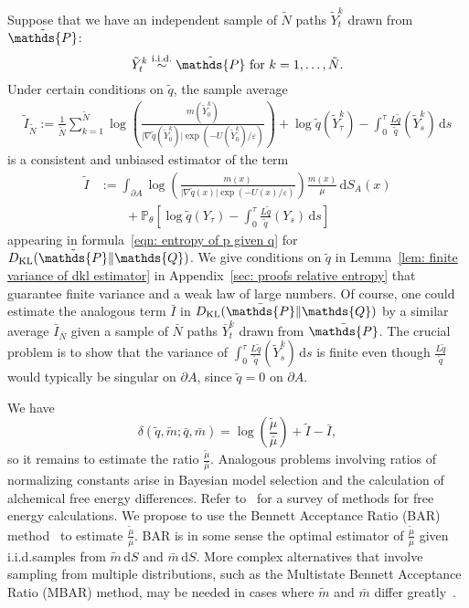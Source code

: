 \documentclass[reqno]{amsart}
\newcommand{\eps}{\varepsilon}
\newcommand{\1}{\mathds{1}}
\renewcommand{\d}{\mathrm{d}}
\newcommand{\grad}{\nabla}
\renewcommand{\P}{\mathds{P}}
\newcommand{\Q}{\mathds{Q}}
\newcommand{\dkl}{D_{\mathrm{KL}}}
\theoremstyle{definition}
\theoremstyle{remark}
\begin{document}
Suppose that we have an independent sample of $\tilde N$ paths $\tilde Y^k_t$ drawn from $\tilde \P$:
\begin{equation*}
  \tilde Y^k_t \overset{\mathrm{i.i.d.}}{\sim}  \tilde \P \text{ for } k = 1, \dots, \tilde N . 
\end{equation*}
Under certain conditions on $\tilde q$, the sample average
\begin{align*}
  \tilde I_{\tilde N}:= \frac{1}{\tilde N} \sum_{k=1}^{\tilde N}   \log \left ( \frac{ m(\tilde Y^k_0)}{\lvert \grad  \tilde q (\tilde Y^k_0) \rvert \exp(-U(\tilde Y^k_0)/\eps)} \right ) + \log \tilde q(\tilde Y^k_\tau) -  \int_0^\tau \frac{L \tilde q}{\tilde q}(\tilde Y^k_s) \, \d s
\end{align*}
is a consistent and unbiased estimator of the term
\begin{align*}
  \tilde I &:= \int_{\partial A}  \log \left ( \frac{ m(x)}{\lvert \grad  \tilde q (x) \rvert \exp(-U(x)/\eps)} \right ) \frac{m(x)}{\mu} \, \d S_A(x) \nonumber \\
                       &\qquad + \P_\theta \left [ \log \tilde q (Y_\tau) -  \int_0^\tau \frac{L \tilde q}{\tilde q}(Y_s) \, \d s  \right ]
\end{align*}
appearing in formula~\eqref{eqn: entropy of p given q} for $\dkl ( \tilde \P \Vert \Q)$. 
 We give conditions on $\tilde q$ in Lemma~\ref{lem: finite variance of dkl estimator} in Appendix~\ref{sec: proofs relative entropy} that guarantee finite variance and a weak law of large numbers. Of course, one could estimate the analogous term $\bar I$ in $\dkl (\bar \P \Vert \Q)$ by a similar average $\bar I_{\bar N}$ given a sample of $\bar N$ paths $\bar Y^k_t$ drawn from $\bar \P$. The crucial problem is to show that the variance of $\int_0^\tau \frac{L \tilde q}{\tilde q}(\tilde Y^k_s) \, \d s$ is finite even though $\frac{L \tilde q}{\tilde q}$ would typically be singular on $\partial A$, since $\tilde q =0$ on $\partial A$.

We have 
\begin{equation*}
 \delta(\tilde q, \tilde m ; \bar q, \bar m) = \log \left ( \frac{\tilde \mu}{\bar \mu} \right ) + \tilde I - \bar I,
\end{equation*}
so it remains to estimate the ratio $\frac{\tilde \mu}{\bar \mu}$. Analogous problems involving ratios of normalizing constants arise in Bayesian model selection and the calculation of alchemical free energy differences. Refer to~\cite{lelievre_free_2010} for a survey of methods for free energy calculations. We propose to use the Bennett Acceptance Ratio (BAR) method~\cite{bennett_efficient_1976} to estimate $ \frac{\tilde \mu}{\bar \mu}$. BAR is in some sense the optimal estimator of $\frac{\tilde \mu}{\bar \mu}$ given i.i.d.\@ samples from $\tilde m \, \d S$ and $\bar m \, \d S$. More complex alternatives that involve sampling from multiple distributions, such as the Multistate Bennett Acceptance Ratio (MBAR) method, may be needed in cases where $\tilde m$ and $\bar m$ differ greatly~\cite{shirts_statistically_2008}. 
\end{document}
